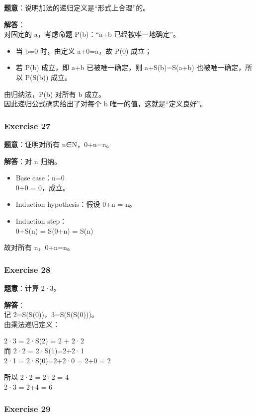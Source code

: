 \documentclass[
  11pt,
]{article}
\providecommand{\tightlist}{%
  \setlength{\itemsep}{0pt}\setlength{\parskip}{0pt}}
\begin{document}
\textbf{题意}：说明加法的递归定义是``形式上合理''的。

\textbf{解答}：\\
对固定的 a，考虑命题 P(b)：``a+b 已经被唯一地确定''。

\begin{itemize}
\tightlist
\item
  当 b=0 时，由定义 a+0=a，故 P(0) 成立；
\item
  若 P(b) 成立，即 a+b 已被唯一确定，则 a+S(b)=S(a+b) 也被唯一确定，所以
  P(S(b)) 成立。
\end{itemize}

由归纳法，P(b) 对所有 b 成立。\\
因此递归公式确实给出了对每个 b 唯一的值，这就是``定义良好''。

\subsubsection{Exercise 27}\label{exercise-27}

\textbf{题意}：证明对所有 n∈N，0+n=n。

\textbf{解答}：对 n 归纳。

\begin{itemize}
\item
  Base case：n=0\\
  0+0 = 0，成立。
\item
  Induction hypothesis：假设 0+n = n。
\item
  Induction step：\\
  0+S(n) = S(0+n) = S(n)
\end{itemize}

故对所有 n，0+n=n。

\subsubsection{Exercise 28}\label{exercise-28}

\textbf{题意}：计算 2·3。

\textbf{解答}：\\
记 2=S(S(0))，3=S(S(S(0)))。\\
由乘法递归定义：

2·3 = 2·S(2) = 2 + 2·2\\
而 2·2 = 2·S(1)=2+2·1\\
2·1 = 2·S(0)=2+2·0 = 2+0 = 2

所以 2·2 = 2+2 = 4\\
2·3 = 2+4 = 6

\subsubsection{Exercise 29}\label{exercise-29}
\end{document}
